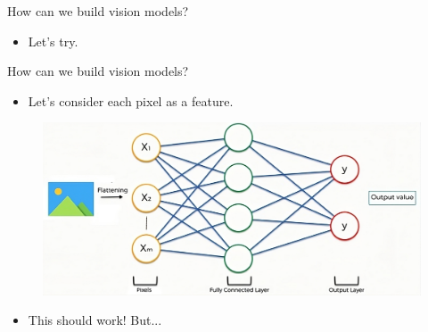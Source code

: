 \documentclass[10pt]{beamer}
\theoremstyle{remark}
\theoremstyle{definition}
\begin{document}
\begin{frame}{How can we build vision models?}
\begin{itemize}
    \item Let's try.
\end{itemize}
\end{frame}

\begin{frame}{How can we build vision models?}
\begin{itemize}
    \item Let's consider each pixel as a feature.
\end{itemize}

\begin{figure}
\includegraphics[width=1.0\textwidth,height=1.0\textheight,keepaspectratio]{./images/images_nn.png}
\end{figure}
\begin{itemize}
    \item This should work! But...
\end{itemize}
\end{frame}
\end{document}
